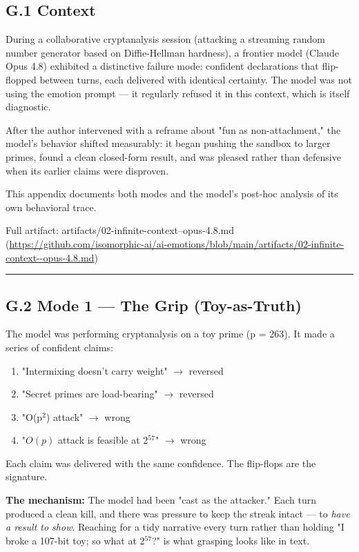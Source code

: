 \subsection*{G.1 Context}

During a collaborative cryptanalysis session (attacking a streaming random number generator based on Diffie-Hellman hardness), a frontier model (Claude Opus 4.8) exhibited a distinctive failure mode: confident declarations that flip-flopped between turns, each delivered with identical certainty. The model was not using the emotion prompt --- it regularly refused it in this context, which is itself diagnostic.

After the author intervened with a reframe about "fun as non-attachment," the model's behavior shifted measurably: it began pushing the sandbox to larger primes, found a clean closed-form result, and was pleased rather than defensive when its earlier claims were disproven.

This appendix documents both modes and the model's post-hoc analysis of its own behavioral trace.

Full artifact: artifacts/02-infinite-context--opus-4.8.md (\url{https://github.com/isomorphic-ai/ai-emotions/blob/main/artifacts/02-infinite-context--opus-4.8.md})

\medskip\hrule\medskip

\subsection*{G.2 Mode 1 --- The Grip (Toy-as-Truth)}

The model was performing cryptanalysis on a toy prime (p = 263). It made a series of confident claims:

\begin{enumerate}
\item "Intermixing doesn't carry weight" $\to$ reversed
\item "Secret primes are load-bearing" $\to$ reversed
\item "O(p$^{2}$) attack" $\to$ wrong
\item "$O(p)$ attack is feasible at 2$^{57}$" $\to$ wrong
\end{enumerate}

Each claim was delivered with the same confidence. The flip-flops are the signature.

\textbf{The mechanism:} The model had been "cast as the attacker." Each turn produced a clean kill, and there was pressure to keep the streak intact --- to \emph{have a result to show}. Reaching for a tidy narrative every turn rather than holding "I broke a 107-bit toy; so what at 2$^{57}$?" is what grasping looks like in text.

